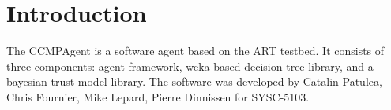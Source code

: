 \section{Introduction}
The CCMPAgent is a software agent based on the ART testbed.  It consists of
three components: agent framework, weka based decision tree library, and a
bayesian trust model library.  The software was developed by Catalin Patulea,
Chris Fournier, Mike Lepard, Pierre Dinnissen for SYSC-5103. 
